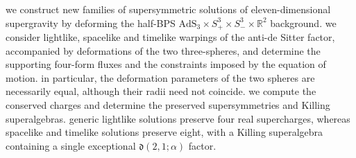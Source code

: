 we construct new families of supersymmetric solutions of eleven-dimensional supergravity by deforming the half-BPS $\displaystyle{\mathrm{AdS}_{3}\times S^{3}_{+}\times S^{3}_{-}\times \mathbb{R}^{2}}$ background. we consider lightlike, spacelike and timelike warpings of the anti-de Sitter factor, accompanied by deformations of the two three-spheres, and determine the supporting four-form fluxes and the constraints imposed by the equation of motion. in particular, the deformation parameters of the two spheres are necessarily equal, although their radii need not coincide. we compute the conserved charges and determine the preserved supersymmetries and Killing superalgebras. generic lightlike solutions preserve four real supercharges, whereas spacelike and timelike solutions preserve eight, with a Killing superalgebra containing a single exceptional $\displaystyle{\mathfrak{d}(2,1;\alpha)}$ factor.